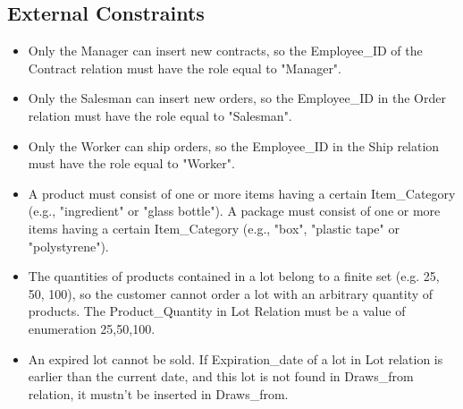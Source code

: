 \subsection{External Constraints}
\begin{itemize}
\item Only the Manager can insert new contracts, so the Employee\_ID of the Contract relation must have the role equal to "Manager". 
\item Only the Salesman can insert new orders, so the Employee\_ID in the Order relation must have the role equal to "Salesman". 
\item Only the Worker can ship orders, so the Employee\_ID in the Ship relation must have the role equal to "Worker".
\item A product must consist of one or more items having a certain Item\_Category (e.g., "ingredient" or "glass bottle"). A package must consist of one or more items having a certain Item\_Category (e.g., "box", "plastic tape" or "polystyrene"). 
\item The quantities of products contained in a lot belong to a finite set (e.g. 25, 50, 100), so the customer cannot order a lot with an arbitrary quantity of products. The Product\_Quantity in Lot Relation must be a value of enumeration  {25,50,100}.
\item An expired lot cannot be sold. If Expiration\_date of a lot in  Lot relation is earlier than the current date, and this lot is not found in Draws\_from relation, it mustn't be  inserted in Draws\_from.
\end{itemize}